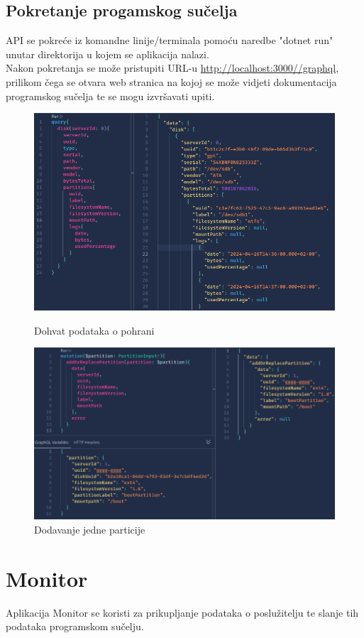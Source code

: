 \documentclass[zavrsnirad]{fer}
\begin{document}
\section{Pokretanje progamskog sučelja}
API se pokreće iz komandne linije/terminala pomoću naredbe "dotnet run" unutar direktorija u kojem se aplikacija nalazi.
\\Nakon pokretanja se može pristupiti URL-u \url{http://localhost:3000//graphql}, prilikom čega se otvara web stranica na kojoj se može vidjeti dokumentacija programskog sučelja te se mogu izvršavati upiti.
\begin{figure}[htb!]
	\centering
	\includegraphics[width=1\linewidth]{images/api_query.png} 
	\caption{Dohvat podataka o pohrani}
	\label{slk:api_query}
	\includegraphics[width=1\linewidth]{images/api_mutation.png} 
	\caption{Dodavanje jedne particije}
	\label{slk:api_mutation}
\end{figure}
\FloatBarrier

\chapter{Monitor}
Aplikacija Monitor se koristi za prikupljanje podataka o poslužitelju te slanje tih podataka programskom sučelju.
\end{document}
